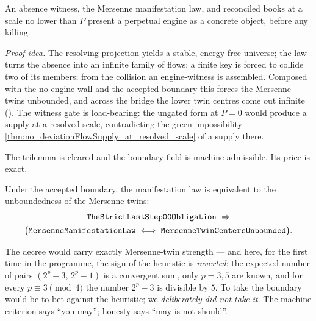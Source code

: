 \begin{theorem}\label{thm:mersenneRefutation_carries_engine}
\green{}\; An absence witness, the Mersenne manifestation law, and reconciled books at a scale
no lower than $P$ present a perpetual engine as a concrete object, before any killing.
\end{theorem}

\emph{Proof idea.} The resolving projection yields a stable, energy-free universe; the law
turns the absence into an infinite family of flows; a finite key is forced to collide two
of its members; from the collision an engine-witness is assembled. Composed with the no-engine
wall and the accepted boundary this forces the Mersenne twins unbounded, and across the
bridge the lower twin centres come out infinite (\green{}). The witness gate is load-bearing:
the ungated form at $P=0$ would produce a supply at a resolved scale, contradicting the green
impossibility \cref{thm:no_deviationFlowSupply_at_resolved_scale} of a supply there.

The trilemma is cleared and the boundary field  is machine-admissible.
Its price is exact.

\begin{theorem}\label{thm:mersenneManifestationLaw_iff_unbounded_of_boundary}
\green{}\; Under the accepted boundary, the manifestation law is equivalent to the
unboundedness of the Mersenne twins:
\begin{equation}\label{eq:mersenne-price}
\begin{gathered}
\texttt{TheStrictLastStep00Obligation}\ \Rightarrow\\
\bigl(\texttt{MersenneManifestationLaw}\iff\texttt{MersenneTwinCentersUnbounded}\bigr).
\end{gathered}
\end{equation}
\end{theorem}

The decree would carry exactly Mersenne-twin strength --- and here, for the first time in the
programme, the sign of the heuristic is \emph{inverted}: the expected number of pairs
$(2^p-3,\,2^p-1)$ is a convergent sum, only $p=3,5$ are known, and for every $p\equiv3\pmod4$
the number $2^p-3$ is divisible by $5$. To take the boundary would be to bet against the
heuristic; we \emph{deliberately did not take it}. The machine criterion says ``you may'';
honesty says ``may is not should''.

